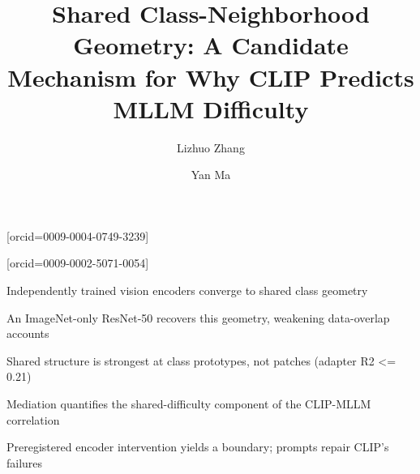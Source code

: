 \documentclass[a4paper,fleqn]{cas-sc}
\begin{document}
\let\WriteBookmarks\relax
\def\floatpagepagefraction{1}
\def\textpagefraction{.001}



\title[mode=title]{Shared Class-Neighborhood Geometry: A Candidate Mechanism for Why CLIP Predicts MLLM Difficulty}

\author[1]{Lizhuo Zhang}[orcid=0009-0004-0749-3239]
\cormark[1]

\author[2]{Yan Ma}[orcid=0009-0002-5071-0054]




\begin{highlights}
\item Independently trained vision encoders converge to shared class geometry
\item An ImageNet-only ResNet-50 recovers this geometry, weakening data-overlap accounts
\item Shared structure is strongest at class prototypes, not patches (adapter R2 <= 0.21)
\item Mediation quantifies the shared-difficulty component of the CLIP-MLLM correlation
\item Preregistered encoder intervention yields a boundary; prompts repair CLIP's failures
\end{highlights}
\end{document}
